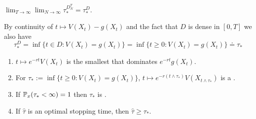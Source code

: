 \begin{corollary}
    $\lim_{T \to \infty} \lim_{N \to \infty} \tau_*^{D_N^T} = \tau_*^D$.
\end{corollary}

\begin{remark}
    By continuity of $t \mapsto V(X_t) - g(X_t)$ and the fact that $D$ is dense in $[0, T]$ we also have 
    \[ \tau_*^D = \inf \{ t \in D : V(X_t) = g(X_t) \} = \inf \{ t \geq 0 : V(X_t) = g(X_t) \} \doteq \tau_* \]
\end{remark}

\begin{theorem}[(OS3)]
    \begin{enumerate}[label=(\roman*)]
        \item $t \mapsto e^{-rt} V(X_t)$ is the smallest  that dominates $e^{-rt} g(X_t)$.
        \item For $\tau_* := \inf \{ t \geq 0 : V(X_t) = g(X_t) \}$, $t \mapsto e^{-r(t \wedge \tau_*)} V(X_{t \wedge \tau_*})$ is a .
        \item If $\mathbb P_x(\tau_* < \infty) = 1$ then $\tau_*$ is .
        \item If $\hat{\tau}$ is an optimal stopping time, then $\hat{\tau} \geq \tau_*$.
    \end{enumerate}
\end{theorem}

